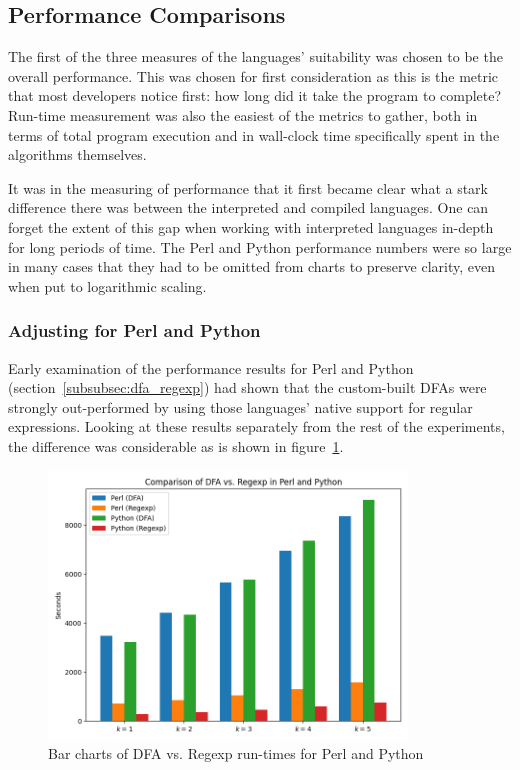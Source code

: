 \subsection{Performance Comparisons}
\label{subsec:perf_comp}

The first of the three measures of the languages' suitability was chosen to be the overall performance. This was chosen for first consideration as this is the metric that most developers notice first: how long did it take the program to complete? Run-time measurement was also the easiest of the metrics to gather, both in terms of total program execution and in wall-clock time specifically spent in the algorithms themselves.

It was in the measuring of performance that it first became clear what a stark difference there was between the interpreted and compiled languages. One can forget the extent of this gap when working with interpreted languages in-depth for long periods of time. The Perl and Python performance numbers were so large in many cases that they had to be omitted from charts to preserve clarity, even when put to logarithmic scaling.

\subsubsection{Adjusting for Perl and Python}
\label{subsubsec:results:perf_perl_python}

Early examination of the performance results for Perl and Python (section~\ref{subsubsec:dfa_regexp}) had shown that the custom-built DFAs were strongly out-performed by using those languages' native support for regular expressions. Looking at these results separately from the rest of the experiments, the difference was considerable as is shown in figure~\ref{fig:graph:dfa_regexp_comp}.

\begin{figure}[h]
	\centering
	\includegraphics[width=0.85\textwidth]{figures/dfa_regexp_comp.png}
	\caption{Bar charts of DFA vs. Regexp run-times for Perl and Python}
	\label{fig:graph:dfa_regexp_comp}
\end{figure}

